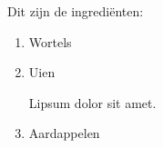 \documentclass{article}
\begin{document}
Dit zijn de ingrediënten:
\begin{enumerate}
    \item Wortels
    \item Uien
    
    Lipsum dolor sit amet.
    \item Aardappelen
\end{enumerate}
\end{document}
